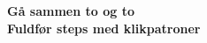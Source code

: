 \begin{frame}
  \vspace{3em}
  \begin{center}
    {\LARGE \textbf{Gå sammen to og to}} \\
    {\LARGE \textbf{Fuldfør steps med klikpatroner}}
  \end{center}
\end{frame}